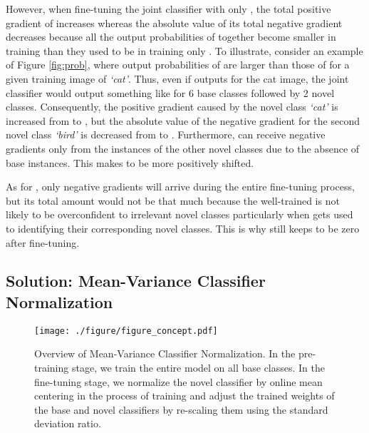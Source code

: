 However, when fine-tuning the joint classifier  with only , the total positive gradient of  increases whereas the absolute value of its total negative gradient decreases because all the output probabilities of  together become smaller in training  than they used to be in training only . To illustrate, consider an example of Figure \ref{fig:prob}, where output probabilities of  are larger than those of  for a given training image of \textit{`cat'}. Thus, even if  outputs  for the cat image, the joint classifier  would output something like  for 6 base classes followed by 2 novel classes. Consequently, the positive gradient caused by the novel class \textit{`cat'} is increased from  to , but the absolute value of the negative gradient for the second novel class \textit{`bird'} is decreased from  to . Furthermore,  can receive negative gradients only from the instances of the other novel classes due to the absence of base instances. This makes  to be more positively shifted. 

As for , only negative gradients will arrive during the entire fine-tuning process, but its total amount would not be that much because the well-trained  is not likely to be overconfident to irrelevant novel classes particularly when  gets used to identifying their corresponding novel classes. This is why  still keeps to be zero after fine-tuning.





































\subsection{Solution: Mean-Variance Classifier Normalization} \label{sec:solution}

\begin{figure*}[t!]
   \centering 
    \texttt{[image: ./figure/figure\_concept.pdf]}
   \caption{Overview of Mean-Variance Classifier Normalization. In the pre-training stage, we train the entire model on all base classes. In the fine-tuning stage, we normalize the novel classifier by online mean centering in the process of training and adjust the trained weights of the base and novel classifiers by re-scaling them using the standard deviation ratio.}
   \label{fig:framework}
\end{figure*}

